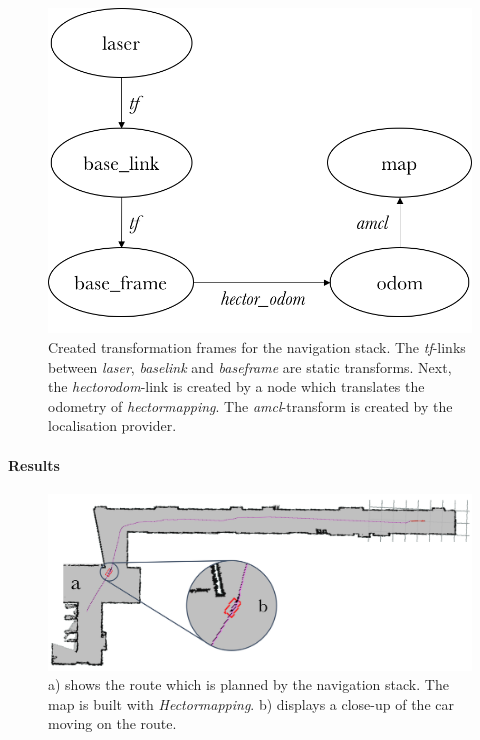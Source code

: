 \documentclass[conference,a4paper]{IEEEtran}
\begin{document}
\begin{figure}[!t]
    \includegraphics[width=\columnwidth]{navstack_tf}
    \centering
    \caption{Created transformation frames for the navigation stack. The \emph{tf}-links between \emph{laser}, \emph{base\textunderscore link} and \emph{base\textunderscore frame} are static transforms. Next, the \emph{hector\textunderscore odom}-link is created by a node which translates the odometry of \emph{hector\textunderscore mapping}. The \emph{amcl}-transform is created by the localisation provider.}
    \label{fig:navstack_tf}
\end{figure}

\paragraph{Results}

\begin{figure}[!t]
	\includegraphics[width=\columnwidth]{navstack_result_1}
	\centering
	\caption{a) shows the route which is planned by the navigation stack. The map is built with \emph{Hector\textunderscore mapping}. b) displays a close-up of the car moving on the route. }
	\label{fig:navstack_result}
\end{figure}
\end{document}
